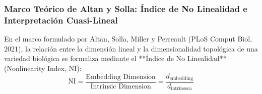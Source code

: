 \documentclass[11pt,a4paper,openany]{book}
\theoremstyle{definition}
\begin{document}
\subsubsection{Marco Teórico de Altan y Solla: Índice de No Linealidad e Interpretación Cuasi-Lineal}
\label{subsubsec:marco_altan_solla_no_linealidad}

En el marco formulado por Altan, Solla, Miller y Perreault (PLoS Comput Biol, 2021), la relación entre la dimensión lineal y la dimensionalidad topológica de una variedad biológica se formaliza mediante el **Índice de No Linealidad** (Nonlinearity Index, NI):
\begin{equation}
\text{NI} = \frac{\text{Embedding Dimension}}{\text{Intrinsic Dimension}} = \frac{d_{\text{embedding}}}{d_{\text{intrínseca}}}
\end{equation}
\end{document}
